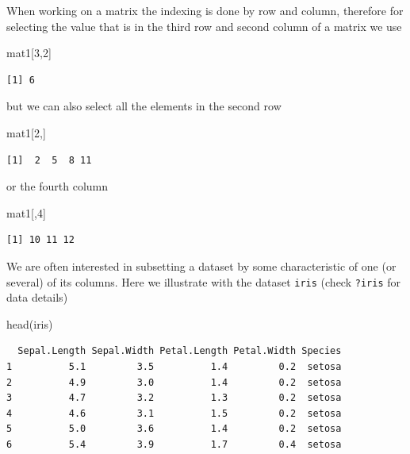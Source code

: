 \documentclass[
  letterpaper,
  DIV=11,
  numbers=noendperiod]{scrartcl}
\newenvironment{Shaded}{\begin{snugshade}}{\end{snugshade}}
\newcommand{\DecValTok}[1]{\textcolor[rgb]{0.68,0.00,0.00}{#1}}
\newcommand{\FunctionTok}[1]{\textcolor[rgb]{0.28,0.35,0.67}{#1}}
\newcommand{\NormalTok}[1]{\textcolor[rgb]{0.00,0.23,0.31}{#1}}
\begin{document}
When working on a matrix the indexing is done by row and column,
therefore for selecting the value that is in the third row and second
column of a matrix we use

\begin{Shaded}
\begin{Highlighting}[]
\NormalTok{mat1[}\DecValTok{3}\NormalTok{,}\DecValTok{2}\NormalTok{]}
\end{Highlighting}
\end{Shaded}

\begin{verbatim}
[1] 6
\end{verbatim}

\noindent but we can also select all the elements in the second row

\begin{Shaded}
\begin{Highlighting}[]
\NormalTok{mat1[}\DecValTok{2}\NormalTok{,]}
\end{Highlighting}
\end{Shaded}

\begin{verbatim}
[1]  2  5  8 11
\end{verbatim}

or the fourth column

\begin{Shaded}
\begin{Highlighting}[]
\NormalTok{mat1[,}\DecValTok{4}\NormalTok{]}
\end{Highlighting}
\end{Shaded}

\begin{verbatim}
[1] 10 11 12
\end{verbatim}

We are often interested in subsetting a dataset by some characteristic
of one (or several) of its columns. Here we illustrate with the dataset
\texttt{iris} (check \texttt{?iris} for data details)

\begin{Shaded}
\begin{Highlighting}[]
\FunctionTok{head}\NormalTok{(iris)}
\end{Highlighting}
\end{Shaded}

\begin{verbatim}
  Sepal.Length Sepal.Width Petal.Length Petal.Width Species
1          5.1         3.5          1.4         0.2  setosa
2          4.9         3.0          1.4         0.2  setosa
3          4.7         3.2          1.3         0.2  setosa
4          4.6         3.1          1.5         0.2  setosa
5          5.0         3.6          1.4         0.2  setosa
6          5.4         3.9          1.7         0.4  setosa
\end{verbatim}
\end{document}
